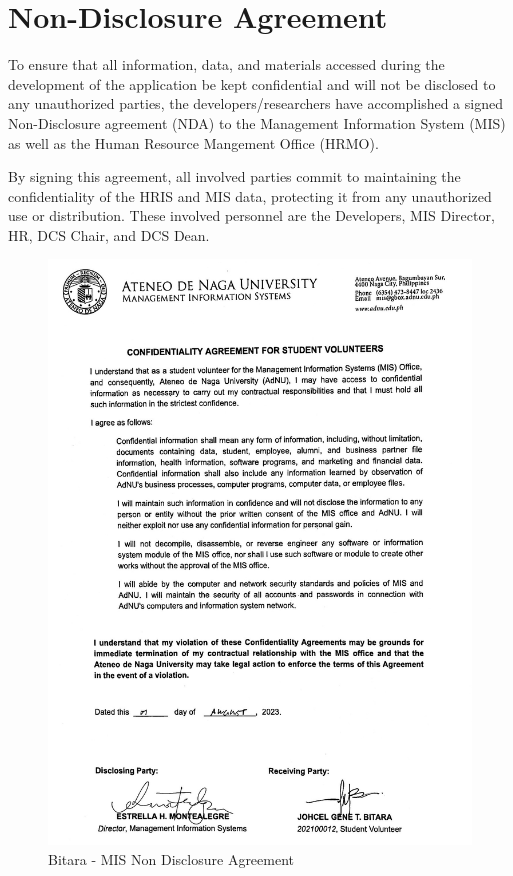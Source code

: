 \chapter{Non-Disclosure Agreement}

\label{nda}

To ensure that all information, data, and materials accessed during the development of the application be kept confidential and will not be disclosed to any unauthorized parties, the developers/researchers have accomplished a signed Non-Disclosure agreement (NDA) to the Management Information System (MIS) as well as the Human Resource Mangement Office (HRMO). 

By signing this agreement, all involved parties commit to maintaining the confidentiality of the HRIS and MIS data, protecting it from any unauthorized use or distribution. These involved personnel are the Developers, MIS Director, HR, DCS Chair, and DCS Dean.

\begin{figure}[H]
    \centering
    \includegraphics[width=1\textwidth]{figures/images/mis-nda-bitara.JPG}
    \caption{Bitara - MIS Non Disclosure Agreement}
    \label{fig:mis-nda-bitara}
\end{figure}